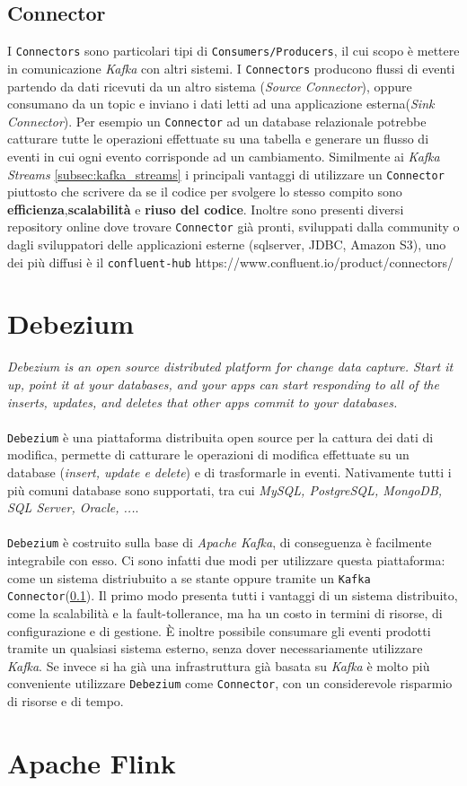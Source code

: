 \subsection{Connector}
\label{subsec:kafka_connectors}
I \texttt{Connectors} sono particolari tipi di \texttt{Consumers/Producers}, il cui scopo è mettere in comunicazione \textit{Kafka} con altri sistemi.
I \texttt{Connectors} producono flussi di eventi partendo da dati ricevuti da un altro sistema (\textit{Source Connector}), oppure consumano da un topic e inviano i dati letti ad una applicazione esterna(\textit{Sink Connector}).
Per esempio un \texttt{Connector} ad un database relazionale potrebbe catturare tutte le operazioni effettuate su una tabella e generare un flusso di eventi in cui ogni evento corrisponde ad un cambiamento.
Similmente ai \textit{Kafka Streams} \ref{subsec:kafka_streams} i principali vantaggi di utilizzare un \texttt{Connector} piuttosto che scrivere da se il codice per svolgere lo stesso compito sono
\textbf{efficienza},\textbf{scalabilità} e \textbf{riuso del codice}.
Inoltre sono presenti diversi repository online dove trovare \texttt{Connector} già pronti, sviluppati dalla community o dagli sviluppatori delle applicazioni esterne (sqlserver, JDBC, Amazon S3),
uno dei più diffusi è il \texttt{confluent-hub} https://www.confluent.io/product/connectors/ 

\section{Debezium}
\label{sec:debezium_overview}
\textit{Debezium is an open source distributed platform for change data capture. Start it up, point it at your databases, and your apps can start responding to all of the inserts, updates, and deletes that other apps commit to your databases.}\cite*{debeziumwebsite}\\\\
\texttt{Debezium} è una piattaforma distribuita open source per la cattura dei dati di modifica, permette di catturare le operazioni di modifica effettuate su un database (\textit{insert, update e delete}) e di trasformarle in eventi.
Nativamente tutti i più comuni database sono supportati, tra cui \textit{MySQL, PostgreSQL, MongoDB, SQL Server, Oracle, ...}.\\\\
\texttt{Debezium} è costruito sulla base di \textit{Apache Kafka}, di conseguenza è facilmente integrabile con esso.
Ci sono infatti due modi per utilizzare questa piattaforma: come un sistema distriubuito a se stante oppure tramite un \texttt{Kafka Connector}(\ref{subsec:kafka_connectors}).
Il primo modo presenta tutti i vantaggi di un sistema distribuito, come la scalabilità e la fault-tollerance, ma ha un costo in termini di risorse, di configurazione e di gestione.
È inoltre possibile consumare gli eventi prodotti tramite un qualsiasi sistema esterno, senza dover necessariamente utilizzare \textit{Kafka}.
Se invece si ha già una infrastruttura già basata su \textit{Kafka} è molto più conveniente utilizzare \texttt{Debezium} come \texttt{Connector}, con un considerevole risparmio di risorse e di tempo.  

\section{Apache Flink}
\label{sec:flink_overview}
